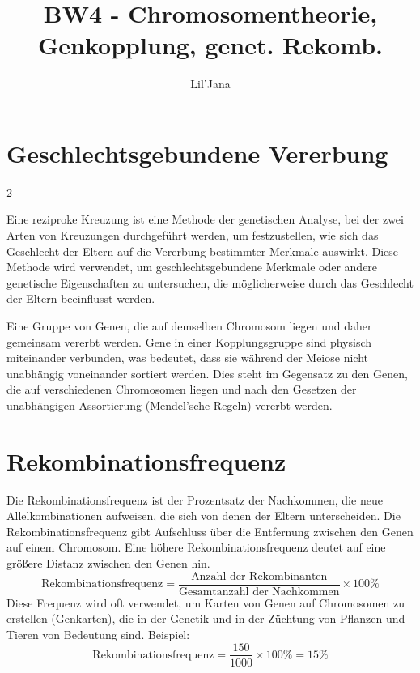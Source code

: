 \documentclass{article}
\title{BW4 - Chromosomentheorie, Genkopplung, genet. Rekomb.}
\author{Lil'Jana}
\begin{document}
\maketitle
\section*{Geschlechtsgebundene Vererbung}
\begin{multicols}{2}
\begin{mechanism}[title={reziproke Kreuzung}]
Eine reziproke Kreuzung ist eine Methode der genetischen Analyse, bei der zwei Arten von Kreuzungen durchgeführt werden, um festzustellen, wie sich das Geschlecht der Eltern auf die Vererbung bestimmter Merkmale auswirkt. Diese Methode wird verwendet, um geschlechtsgebundene Merkmale oder andere genetische Eigenschaften zu untersuchen, die möglicherweise durch das Geschlecht der Eltern beeinflusst werden.
\end{mechanism}
\columnbreak
\begin{mybox}[title={Kopplungsgruppe}]
Eine Gruppe von Genen, die auf demselben Chromosom liegen und daher gemeinsam vererbt werden. Gene in einer Kopplungsgruppe sind physisch miteinander verbunden, was bedeutet, dass sie während der Meiose nicht unabhängig voneinander sortiert werden. Dies steht im Gegensatz zu den Genen, die auf verschiedenen Chromosomen liegen und nach den Gesetzen der unabhängigen Assortierung (Mendel'sche Regeln) vererbt werden.
\end{mybox}
\end{multicols} 
\section*{Rekombinationsfrequenz}
Die Rekombinationsfrequenz ist der Prozentsatz der Nachkommen, die neue Allelkombinationen aufweisen, die sich von denen der Eltern unterscheiden. \newline
Die Rekombinationsfrequenz gibt Aufschluss über die Entfernung zwischen den Genen auf einem Chromosom. Eine höhere Rekombinationsfrequenz deutet auf eine größere Distanz zwischen den Genen hin.
\[
\text{Rekombinationsfrequenz} = \frac{\text{Anzahl der Rekombinanten}}{\text{Gesamtanzahl der Nachkommen}} \times 100 \%
\]
Diese Frequenz wird oft verwendet, um Karten von Genen auf Chromosomen zu erstellen (Genkarten), die in der Genetik und in der Züchtung von Pflanzen und Tieren von Bedeutung sind. \newline
Beispiel: \[
\text{Rekombinationsfrequenz} = \frac{150}{1000} \times 100 \% = 15 \%
\]
\end{document}
